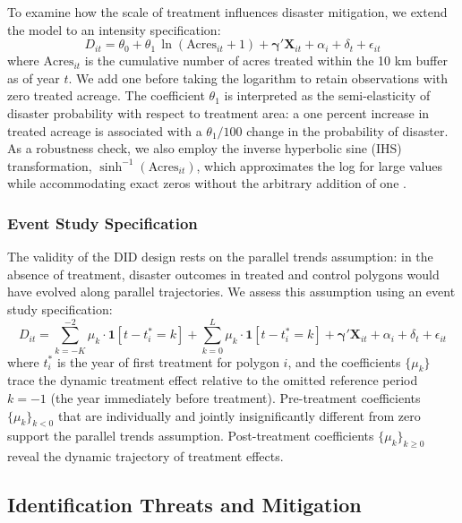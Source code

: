 \documentclass[12pt, letterpaper]{article}
\begin{document}
To examine how the scale of treatment influences disaster mitigation, we extend the model to an intensity specification:
\begin{equation}
    D_{it} = \theta_0 + \theta_1 \, \ln(\text{Acres}_{it} + 1) + \boldsymbol{\gamma}' \mathbf{X}_{it} + \alpha_i + \delta_t + \epsilon_{it}
    \label{eq:did_intensive}
\end{equation}
where $\text{Acres}_{it}$ is the cumulative number of acres treated within the 10 km buffer as of year $t$. We add one before taking the logarithm to retain observations with zero treated acreage. The coefficient $\theta_1$ is interpreted as the semi-elasticity of disaster probability with respect to treatment area: a one percent increase in treated acreage is associated with a $\theta_1 / 100$ change in the probability of disaster. As a robustness check, we also employ the inverse hyperbolic sine (IHS) transformation, $\sinh^{-1}(\text{Acres}_{it})$, which approximates the log for large values while accommodating exact zeros without the arbitrary addition of one \citep{bellemare2020}.

\subsubsection{Event Study Specification}

The validity of the DID design rests on the parallel trends assumption: in the absence of treatment, disaster outcomes in treated and control polygons would have evolved along parallel trajectories. We assess this assumption using an event study specification:
\begin{equation}
    D_{it} = \sum_{k=-K}^{-2} \mu_k \cdot \mathbf{1}[t - t_i^* = k] + \sum_{k=0}^{L} \mu_k \cdot \mathbf{1}[t - t_i^* = k] + \boldsymbol{\gamma}' \mathbf{X}_{it} + \alpha_i + \delta_t + \epsilon_{it}
    \label{eq:event_study}
\end{equation}
where $t_i^*$ is the year of first treatment for polygon $i$, and the coefficients $\{\mu_k\}$ trace the dynamic treatment effect relative to the omitted reference period $k = -1$ (the year immediately before treatment). Pre-treatment coefficients $\{\mu_k\}_{k < 0}$ that are individually and jointly insignificantly different from zero support the parallel trends assumption. Post-treatment coefficients $\{\mu_k\}_{k \geq 0}$ reveal the dynamic trajectory of treatment effects.

\subsection{Identification Threats and Mitigation}
\end{document}
